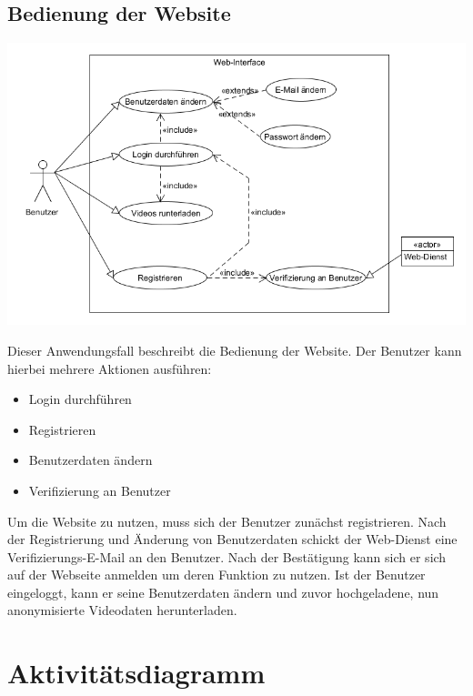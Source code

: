 \subsection{Bedienung der Website}
\begin{center}
\includegraphics[width=1\textwidth]{subtopicsFuncspec/Res/systemModels/WebsiteAWFDiagram.png}
\end{center}	
Dieser Anwendungsfall beschreibt die Bedienung der Website.
Der Benutzer kann hierbei mehrere Aktionen ausführen:
\begin{itemize}
\itemsep0pt
\item Login durchführen
\item Registrieren
\item Benutzerdaten ändern
\item Verifizierung an Benutzer
\end{itemize}
Um die Website zu nutzen, muss sich der Benutzer zunächst registrieren. Nach der Registrierung und Änderung von Benutzerdaten schickt der Web-Dienst eine Verifizierungs-E-Mail an den Benutzer. Nach der Bestätigung kann sich er sich auf der Webseite anmelden um deren Funktion zu nutzen. Ist der Benutzer eingeloggt, kann er seine Benutzerdaten ändern und zuvor hochgeladene, nun anonymisierte Videodaten herunterladen.

\section{Aktivitätsdiagramm}
